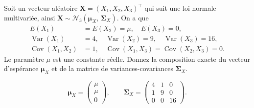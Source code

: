 \begin{questions}
\begin{parts}

\end{parts}



\question[6]
Soit un vecteur aléatoire $\mathbf X=(X_1,X_2,X_3)^\top$ qui suit une loi normale multivariée, ainsi $\mathbf X \sim \mathcal{N}_3 \left( \boldsymbol{\mu}_X, \, \boldsymbol{\Sigma}_X \right)$. On a que
\begin{align*}
E(X_1)&=E(X_2)=\mu,\quad E(X_3)=0, \\
\operatorname{Var}(X_1)&=4,\quad \operatorname{Var}(X_2)=9,\quad
\operatorname{Var}(X_3)=16, \\
\operatorname{Cov}(X_1,X_2)&=1,\quad
\operatorname{Cov}(X_1,X_3)=\operatorname{Cov}(X_2,X_3)=0.
\end{align*}
Le paramètre $\mu$ est une constante réelle.
Donnez la composition exacte du vecteur d'espérance $\boldsymbol{\mu}_X$ et de la matrice de variances-covariances $\boldsymbol{\Sigma}_X$. 

\begin{solution}
\[
\boldsymbol\mu_X=\begin{pmatrix}\mu\\\mu\\0\end{pmatrix},\qquad
\boldsymbol\Sigma_X=\begin{pmatrix}4&1&0\\1&9&0\\0&0&16\end{pmatrix}.
\]
\end{solution}


\end{questions}
